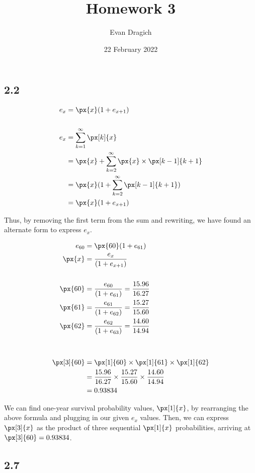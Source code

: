 \documentclass[
]{article}
\title{Homework 3}
\author{Evan Dragich}
\date{22 February 2022}
\begin{document}
\maketitle

\hypertarget{section}{%
\subsection{2.2}\label{section}}

\[
\begin{aligned}
e_{x} &= \px{x}(1 + e_{x + 1}) \\ \\
e_{x} &= \sum_{k = 1}^{\infty} \px[k]{x} \\
&= \px{x} + \sum_{k = 2}^{\infty}\px{x} \times \px[k - 1]{k + 1} \\
&= \px{x}(1 + \sum_{k = 2}^{\infty}\px[k - 1]{k + 1}) \\
&= \px{x}(1 + e_{x + 1})
\end{aligned}
\]

Thus, by removing the first term from the sum and rewriting, we have
found an alternate form to express \(e_{x}\).

\[
\begin{aligned}
e_{60} &= \px{60}(1 + e_{61}) \\ 
\px{x} &= \frac{e_{x}}{(1 + e_{x + 1})} \\\\
\px{60} &= \frac{e_{60}}{(1 + e_{61})} = \frac{15.96}{16.27} \\
\px{61} &= \frac{e_{61}}{(1 + e_{62})} = \frac{15.27}{15.60} \\
\px{62} &= \frac{e_{62}}{(1 + e_{63})} = \frac{14.60}{14.94} \\ \\ \\
\px[3]{60} &= \px[1]{60} \times \px[1]{61} \times \px[1]{62} \\
&= \frac{15.96}{16.27} \times \frac{15.27}{15.60} \times \frac{14.60}{14.94} \\ 
&= 0.93834
\end{aligned}
\]

We can find one-year survival probability values, \(\px[1]{x}\), by
rearranging the above formula and plugging in our given \(e_{x}\)
values. Then, we can express \(\px[3]{x}\) as the product of three
sequential \(\px[1]{x}\) probabilities, arriving at
\(\px[3]{60} = 0.93834\).

\hypertarget{section-1}{%
\subsection{2.7}\label{section-1}}
\end{document}

